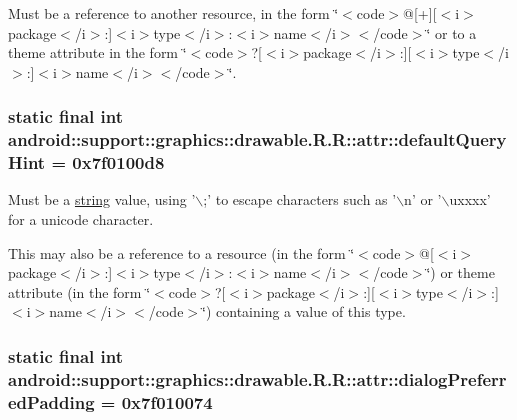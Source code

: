 Must be a reference to another resource, in the form \char`\"{}$<$code$>$@\mbox{[}+\mbox{]}\mbox{[}$<$i$>$package$<$/i$>$:\mbox{]}$<$i$>$type$<$/i$>$:$<$i$>$name$<$/i$>$$<$/code$>$\char`\"{} or to a theme attribute in the form \char`\"{}$<$code$>$?\mbox{[}$<$i$>$package$<$/i$>$:\mbox{]}\mbox{[}$<$i$>$type$<$/i$>$:\mbox{]}$<$i$>$name$<$/i$>$$<$/code$>$\char`\"{}. \hypertarget{classandroid_1_1support_1_1graphics_1_1drawable_1_1_r_1_1attr_1547dbc481fa384a5f80d2d2652d5d29}{
\subsubsection[{defaultQueryHint}]{\setlength{\rightskip}{0pt plus 5cm}static final int android::support::graphics::drawable.R.R::attr::defaultQueryHint = 0x7f0100d8}}
\label{classandroid_1_1support_1_1graphics_1_1drawable_1_1_r_1_1attr_1547dbc481fa384a5f80d2d2652d5d29}


Must be a \hyperlink{classandroid_1_1support_1_1graphics_1_1drawable_1_1_r_1_1string}{string} value, using '$\backslash$;' to escape characters such as '$\backslash$n' or '$\backslash$uxxxx' for a unicode character. 

This may also be a reference to a resource (in the form \char`\"{}$<$code$>$@\mbox{[}$<$i$>$package$<$/i$>$:\mbox{]}$<$i$>$type$<$/i$>$:$<$i$>$name$<$/i$>$$<$/code$>$\char`\"{}) or theme attribute (in the form \char`\"{}$<$code$>$?\mbox{[}$<$i$>$package$<$/i$>$:\mbox{]}\mbox{[}$<$i$>$type$<$/i$>$:\mbox{]}$<$i$>$name$<$/i$>$$<$/code$>$\char`\"{}) containing a value of this type. \hypertarget{classandroid_1_1support_1_1graphics_1_1drawable_1_1_r_1_1attr_555c497c9b2f1bdf88a241f75a4ac4d6}{
\subsubsection[{dialogPreferredPadding}]{\setlength{\rightskip}{0pt plus 5cm}static final int android::support::graphics::drawable.R.R::attr::dialogPreferredPadding = 0x7f010074}}
\label{classandroid_1_1support_1_1graphics_1_1drawable_1_1_r_1_1attr_555c497c9b2f1bdf88a241f75a4ac4d6}


